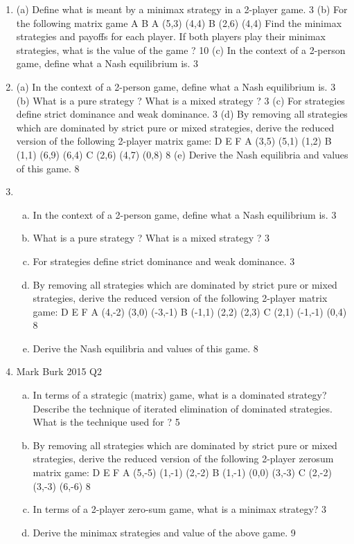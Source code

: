 

\newcommand \x{\overline{x}}
\newcommand \y{\overline{y}}


\begin{enumerate}
\item (a) Define what is meant by a minimax strategy in a 2-player game. 3 %
(b) For the following matrix game
A B
A (5,3) (4,4)
B (2,6) (4,4)
Find the minimax strategies and payoffs for each player. If both players
play their minimax strategies, what is the value of the game ? 10 %
(c) In the context of a 2-person game, define what a Nash equilibrium is. 3 %
\item (a) In the context of a 2-person game, define what a Nash equilibrium is. 3
(b) What is a pure strategy ? What is a mixed strategy ? 3
(c) For strategies define strict dominance and weak dominance. 3
(d) By removing all strategies which are dominated by strict pure or mixed
strategies, derive the reduced version of the following 2-player matrix
game:
D E F
A (3,5) (5,1) (1,2)
B (1,1) (6,9) (6,4)
C (2,6) (4,7) (0,8)
8
(e) Derive the Nash equilibria and values of this game. 8
\item 

\begin{enumerate}[(a)]
\item In the context of a 2-person game, define what a Nash equilibrium is. 3
\item What is a pure strategy ? What is a mixed strategy ? 3
\item For strategies define strict dominance and weak dominance. 3
\item By removing all strategies which are dominated by strict pure or mixed
strategies, derive the reduced version of the following 2-player matrix
game:
D E F
A (4,-2) (3,0) (-3,-1)
B (-1,1) (2,2) (2,3)
C (2,1) (-1,-1) (0,4)
8
\item  Derive the Nash equilibria and values of this game. 8
\end{enumerate}

\item Mark Burk 2015 Q2
\begin{enumerate}[(a)]
\item  In terms of a strategic (matrix) game, what is a dominated strategy?
Describe the technique of iterated elimination of dominated strategies.
What is the technique used for ? 5
\item By removing all strategies which are dominated by strict pure or mixed
strategies, derive the reduced version of the following 2-player zerosum
matrix game:
D E F
A (5,-5) (1,-1) (2,-2)
B (1,-1) (0,0) (3,-3)
C (2,-2) (3,-3) (6,-6)
8
\item In terms of a 2-player zero-sum game, what is a minimax strategy? 3
\item Derive the minimax strategies and value of the above game. 9
\end{enumerate}




\end{enumerate}
